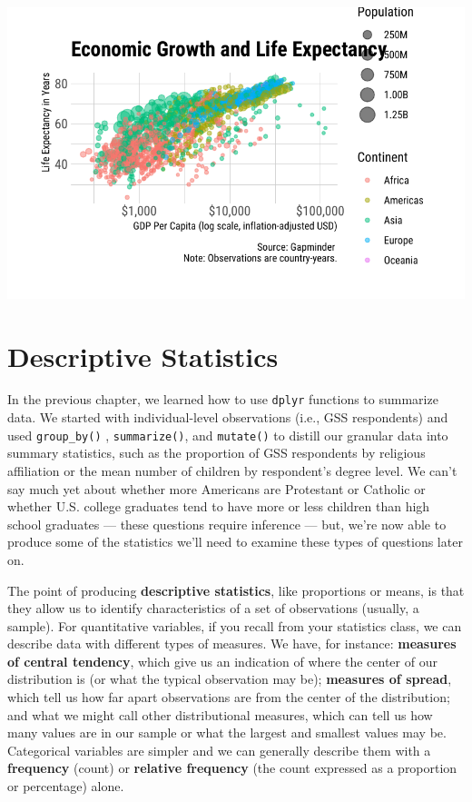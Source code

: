 \documentclass[
  letterpaper,
]{book}
\begin{document}
\includegraphics{visualizing-with-ggplot_files/figure-pdf/unnamed-chunk-2-1.pdf}

\hypertarget{descriptive-statistics}{%
\section{Descriptive Statistics}\label{descriptive-statistics}}

In the previous chapter, we learned how to use \texttt{dplyr} functions
to summarize data. We started with individual-level observations (i.e.,
GSS respondents) and used \texttt{group\_by()} , \texttt{summarize()},
and \texttt{mutate()} to distill our granular data into summary
statistics, such as the proportion of GSS respondents by religious
affiliation or the mean number of children by respondent's degree level.
We can't say much yet about whether more Americans are Protestant or
Catholic or whether U.S. college graduates tend to have more or less
children than high school graduates --- these questions require
inference --- but, we're now able to produce some of the statistics
we'll need to examine these types of questions later on.

The point of producing \textbf{descriptive statistics}, like proportions
or means, is that they allow us to identify characteristics of a set of
observations (usually, a sample). For quantitative variables, if you
recall from your statistics class, we can describe data with different
types of measures. We have, for instance: \textbf{measures of central
tendency}, which give us an indication of where the center of our
distribution is (or what the typical observation may be);
\textbf{measures of spread}, which tell us how far apart observations
are from the center of the distribution; and what we might call other
distributional measures, which can tell us how many values are in our
sample or what the largest and smallest values may be. Categorical
variables are simpler and we can generally describe them with a
\textbf{frequency} (count) or \textbf{relative frequency} (the count
expressed as a proportion or percentage) alone.
\end{document}
